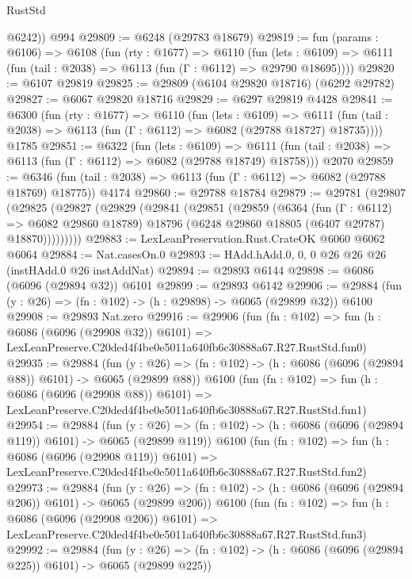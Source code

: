 \begin{lexlean}{RustStd}
\begin{coremodule}
        @6242))
    @994
@29809 := @6248 (@29783 @18679)
@29819 := fun (params : @6106) =>
  @6108
    (fun (rty : @1677) =>
    @6110
      (fun (lets : @6109) =>
      @6111 (fun (tail : @2038) => @6113 (fun (Γ : @6112) => @29790 @18695))))
@29820 := @6107 @29819
@29825 := @29809 (@6104 @29820 @18716) (@6292 @29782)
@29827 := @6067 @29820 @18716
@29829 := @6297 @29819 @4428
@29841 := @6300
    (fun (rty : @1677) =>
    @6110
      (fun (lets : @6109) =>
      @6111 (fun (tail : @2038) => @6113 (fun (Γ : @6112) => @6082 (@29788 @18727) @18735))))
    @1785
@29851 := @6322
    (fun (lets : @6109) =>
    @6111 (fun (tail : @2038) => @6113 (fun (Γ : @6112) => @6082 (@29788 @18749) @18758)))
    @2070
@29859 := @6346
    (fun (tail : @2038) => @6113 (fun (Γ : @6112) => @6082 (@29788 @18769) @18775))
    @4174
@29860 := @29788 @18784
@29879 := @29781
    (@29807
      (@29825
        (@29827
          (@29829
            (@29841
              (@29851
                (@29859
                  (@6364
                    (fun (Γ : @6112) => @6082 @29860 @18789)
                    @18796
                    (@6248 @29860 @18805 (@6407 @29787) @18870)))))))))
@29883 := LexLeanPreservation.Rust.CrateOK @6060 @6062 @6064
@29884 := Nat.casesOn.{0}
@29893 := HAdd.hAdd.{0, 0, 0} @26 @26 @26 (instHAdd.{0} @26 instAddNat)
@29894 := @29893 @6144
@29898 := @6086 (@6096 (@29894 @32)) @6101
@29899 := @29893 @6142
@29906 := @29884 (fun (y : @26) => (fn : @102) -> (h : @29898) -> @6065 (@29899 @32)) @6100
@29908 := @29893 Nat.zero
@29916 := @29906
    (fun (fn : @102) =>
    fun (h : @6086 (@6096 (@29908 @32)) @6101) =>
    LexLeanPreserve.C20ded4f4be0e5011a640fb6c30888a67.R27.RustStd.fun0)
@29935 := @29884
    (fun (y : @26) => (fn : @102) -> (h : @6086 (@6096 (@29894 @88)) @6101) -> @6065 (@29899 @88))
    @6100
    (fun (fn : @102) =>
    fun (h : @6086 (@6096 (@29908 @88)) @6101) =>
    LexLeanPreserve.C20ded4f4be0e5011a640fb6c30888a67.R27.RustStd.fun1)
@29954 := @29884
    (fun (y : @26) => (fn : @102) -> (h : @6086 (@6096 (@29894 @119)) @6101) -> @6065 (@29899 @119))
    @6100
    (fun (fn : @102) =>
    fun (h : @6086 (@6096 (@29908 @119)) @6101) =>
    LexLeanPreserve.C20ded4f4be0e5011a640fb6c30888a67.R27.RustStd.fun2)
@29973 := @29884
    (fun (y : @26) => (fn : @102) -> (h : @6086 (@6096 (@29894 @206)) @6101) -> @6065 (@29899 @206))
    @6100
    (fun (fn : @102) =>
    fun (h : @6086 (@6096 (@29908 @206)) @6101) =>
    LexLeanPreserve.C20ded4f4be0e5011a640fb6c30888a67.R27.RustStd.fun3)
@29992 := @29884
    (fun (y : @26) => (fn : @102) -> (h : @6086 (@6096 (@29894 @225)) @6101) -> @6065 (@29899 @225))

\end{coremodule}
\end{lexlean}
